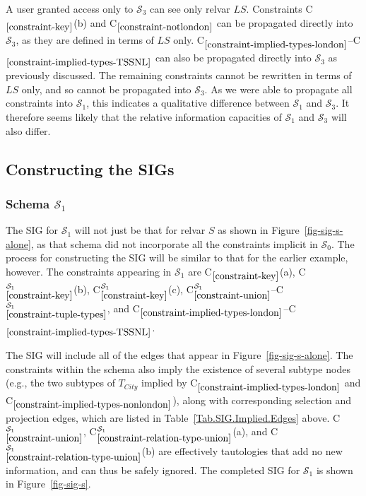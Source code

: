 \documentclass{sig-alternate-05-2015}
\newcounter{constraint}
\newcommand{\LS}{\ensuremath{\mathit{LS}}}
\newcommand{\T}[1]{\ensuremath{T_{#1}}}
\newcommand{\SC}[1]{\ensuremath{\mathcal{S}_{#1}}}
\newcommand{\Constraint}[2][]{C\ensuremath{_{#2}\ifx&#1&\else^{#1}\fi}}
\begin{document}
\noindent A user granted access only to \(\SC{3}\) can see only relvar \(\LS\). Constraints \Constraint{\ref{constraint-key}}(b) and \Constraint{\ref{constraint-notlondon}} can be propagated directly into \(\SC{3}\), as they are defined in terms of \(\LS\) only. \Constraint{\ref{constraint-implied-types-london}}--\Constraint{\ref{constraint-implied-types-TSSNL}} can also be propagated directly into \(\SC{3}\) as previously discussed. The remaining constraints cannot be rewritten in terms of \(\LS\) only, and so cannot be propagated into \(\SC{3}\). As we were able to propagate all constraints into \(\SC{1}\), this indicates a qualitative difference between \(\SC{1}\) and \(\SC{3}\). It therefore seems likely that the relative information capacities of \(\SC{1}\) and \(\SC{3}\) will also differ.



\subsection{Constructing the SIGs}
\label{sec-date-sigs}




\subsubsection{Schema \(\SC{1}\)}
\label{sec-sigs-s-i}

\noindent The SIG for \(\SC{1}\) will not just be that for relvar \(S\) as shown in Figure~\ref{fig-sig-s-alone}, as that schema did not incorporate all the constraints implicit in \(\SC{0}\). The process for constructing the SIG will be similar to that for the earlier example, however. The constraints appearing in \(\SC{1}\) are \Constraint{\ref{constraint-key}}(a), \Constraint[\SC{1}]{\ref{constraint-key}}(b), \Constraint[\SC{1}]{\ref{constraint-key}}(c), \Constraint[\SC{1}]{\ref{constraint-union}}--\Constraint[\SC{1}]{\ref{constraint-tuple-types}}, and \Constraint{\ref{constraint-implied-types-london}}--\Constraint{\ref{constraint-implied-types-TSSNL}}.

The SIG will include all of the edges that appear in Figure~\ref{fig-sig-s-alone}. The constraints within the schema also imply the existence of several subtype nodes (e.g., the two subtypes of \(\T{City}\) implied by \Constraint{\ref{constraint-implied-types-london}} and \Constraint{\ref{constraint-implied-types-nonlondon}}), along with corresponding selection and projection edges, which are listed in Table~\ref{Tab.SIG.Implied.Edges} above. \Constraint[\SC{1}]{\ref{constraint-union}}, \Constraint[\SC{1}]{\ref{constraint-relation-type-union}}(a), and \Constraint[\SC{1}]{\ref{constraint-relation-type-union}}(b) are effectively tautologies that add no new information, and can thus be safely ignored. The completed SIG for \(\SC{1}\) is shown in Figure~\ref{fig-sig-s}.
\end{document}
